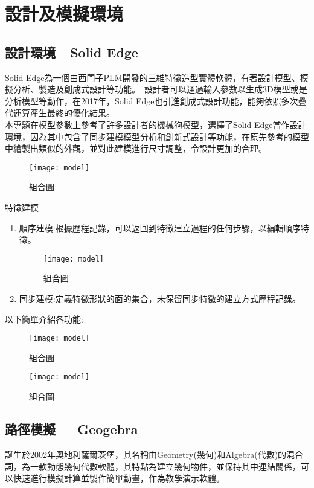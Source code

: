 \chapter{設計及模擬環境}

\section{設計環境---Solid Edge}
Solid Edge為一個由西門子PLM開發的三維特徵造型實體軟體，有著設計模型、模擬分析、製造及創成式設計等功能。\
設計者可以通過輸入參數以生成3D模型或是分析模型等動作，在2017年，Solid Edge也引進創成式設計功能，能夠依照多次疊代運算產生最終的優化結果。\\

本專題在模型參數上參考了許多設計者的機械狗模型，選擇了Solid Edge當作設計環境，因為其中包含了同步建模模型分析和創新式設計等功能，在原先參考的模型中繪製出類似的外觀，並對此建模進行尺寸調整，令設計更加的合理。\\

\begin{figure}[hbt!]
\center
\texttt{[image: model]}
\caption{\Large 組合圖}
\label{model}
\end{figure}

\qquad 特徵建模
\begin{enumerate}
\item 順序建模:根據歷程記錄，可以返回到特徵建立過程的任何步驟，以編輯順序特徵。
\begin{figure}[hbt!]
\center
\texttt{[image: model]}
\caption{\Large 組合圖}
\label{model}
\end{figure}

\item 同步建模:定義特徵形狀的面的集合，未保留同步特徵的建立方式歷程記錄。
\end{enumerate}
以下簡單介紹各功能:\\

\begin{figure}[hbt!]
\center
\texttt{[image: model]}
\caption{\Large 組合圖}
\label{model}
\end{figure}

\begin{figure}[hbt!]
\center
\texttt{[image: model]}
\caption{\Large 組合圖}
\label{model}
\end{figure}
\section{路徑模擬-----Geogebra}
誕生於2002年奧地利薩爾茨堡，其名稱由Geometry(幾何)和Algebra(代數)的混合詞，為一款動態幾何代數軟體，其特點為建立幾何物件，並保持其中連結關係，可以快速進行模擬計算並製作簡單動畫，作為教學演示軟體。\\

